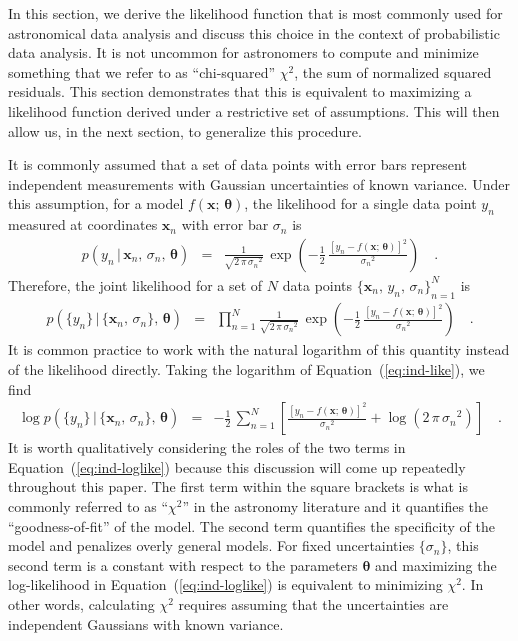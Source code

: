 \documentclass[modern, letterpaper]{aastex61}
\renewcommand{\eqref}[1]{\ref{eq:#1}}
\newcommand{\Eq}[1]{Equation~(\eqref{#1})}
\newcommand{\eq}[1]{\Eq{#1}}
\newcommand{\eqlabel}[1]{\label{eq:#1}}
\newcommand{\bvec}[1]{{\ensuremath{\boldsymbol{#1}}}}
\begin{document}
In this section, we derive the likelihood function that is most commonly used
for astronomical data analysis and discuss this choice in the context of
probabilistic data analysis.
It is not uncommon for astronomers to compute and minimize something that we
refer to as ``chi-squared'' $\chi^2$, the sum of normalized squared residuals.
This section demonstrates that this is equivalent to maximizing a likelihood
function derived under a restrictive set of assumptions.
This will then allow us, in the next section, to generalize this procedure.

It is commonly assumed that a set of data points with error bars represent
independent measurements with Gaussian uncertainties of known variance.
Under this assumption, for a model $f(\bvec{x};\,\bvec{\theta})$, the
likelihood for a single data point $y_n$ measured at coordinates $\bvec{x}_n$
with error bar $\sigma_n$ is
\begin{eqnarray}
p(y_n\,|\,\bvec{x}_n,\,\sigma_n,\,\bvec{\theta}) &=&
    \frac{1}{\sqrt{2\,\pi\,{\sigma_n}^2}}\,\exp\left(
    -\frac{1}{2}\,\frac{{[y_n-f(\bvec{x};\,\bvec{\theta})]}^2}{{\sigma_n}^2}
    \right) \quad.
\end{eqnarray}
Therefore, the joint likelihood for a set of $N$ data points ${\{\bvec{x}_n,\,
y_n,\, \sigma_n\}}_{n=1}^N$ is
\begin{eqnarray}\eqlabel{ind-like}
p(\{y_n\}\,|\,\{\bvec{x}_n,\,\sigma_n\},\,\bvec{\theta}) &=&
    \prod_{n=1}^N\frac{1}{\sqrt{2\,\pi\,{\sigma_n}^2}}\,\exp\left(
    -\frac{1}{2}\,\frac{{[y_n-f(\bvec{x};\,\bvec{\theta})]}^2}{{\sigma_n}^2}
    \right) \quad.
\end{eqnarray}
It is common practice to work with the natural logarithm of this quantity
instead of the likelihood directly.
Taking the logarithm of \eq{ind-like}, we find
\begin{eqnarray}\eqlabel{ind-loglike}
\log p(\{y_n\}\,|\,\{\bvec{x}_n,\,\sigma_n\},\,\bvec{\theta}) &=&
    -\frac{1}{2}\,\sum_{n=1}^N\left[
    \frac{{[y_n-f(\bvec{x};\,\bvec{\theta})]}^2}{{\sigma_n}^2}
    +\log {(2\,\pi\,{\sigma_n}^2)}
    \right]\quad.
\end{eqnarray}
It is worth qualitatively considering the roles of the two terms in
\eq{ind-loglike} because this discussion will come up repeatedly throughout
this paper.
The first term within the square brackets is what is commonly referred to as
``$\chi^2$'' in the astronomy literature and it quantifies the
``goodness-of-fit'' of the model.
The second term quantifies the specificity of the model and penalizes overly
general models.
For fixed uncertainties $\{\sigma_n\}$, this second term is a constant with
respect to the parameters $\bvec{\theta}$ and maximizing the log-likelihood in
\eq{ind-loglike} is equivalent to minimizing $\chi^2$.
In other words, calculating $\chi^2$ requires assuming that the uncertainties
are independent Gaussians with known variance.
\end{document}
